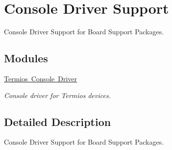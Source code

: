 \hypertarget{group__RTEMSBSPsSharedConsole}{}\section{Console Driver Support}
\label{group__RTEMSBSPsSharedConsole}


Console Driver Support for Board Support Packages.  


\subsection*{Modules}
\begin{DoxyCompactItemize}
\item 
\mbox{\hyperlink{group__ConsoleTermios}{Termios Console Driver}}
\begin{DoxyCompactList}\small\item\em Console driver for Termios devices. \end{DoxyCompactList}\end{DoxyCompactItemize}


\subsection{Detailed Description}
Console Driver Support for Board Support Packages. 

